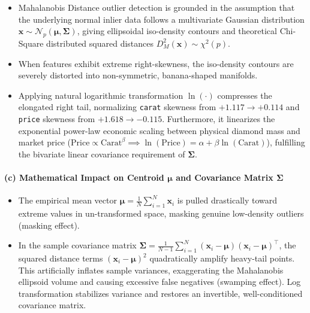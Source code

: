 \begin{tcolorbox}
\begin{itemize}
\tightlist
\item
  Mahalanobis Distance outlier detection is grounded in the assumption that the underlying normal inlier data follows a multivariate Gaussian distribution \(\mathbf{x} \sim \mathcal{N}_p(\boldsymbol{\mu}, \mathbf{\Sigma})\), giving ellipsoidal iso-density contours and theoretical Chi-Square distributed squared distances \(D_M^2(\mathbf{x}) \sim \chi^2(p)\).
\item
  When features exhibit extreme right-skewness, the iso-density contours are severely distorted into non-symmetric, banana-shaped manifolds.
\item
  Applying natural logarithmic transformation \(\ln(\cdot)\) compresses the elongated right tail, normalizing \texttt{carat} skewness from \(+1.117 \to +0.114\) and \texttt{price} skewness from \(+1.618 \to -0.115\). Furthermore, it linearizes the exponential power-law economic scaling between physical diamond mass and market price (\(\mathrm{Price} \propto \mathrm{Carat}^\beta \implies \ln(\mathrm{Price}) = \alpha + \beta \ln(\mathrm{Carat})\)), fulfilling the bivariate linear covariance requirement of \(\mathbf{\Sigma}\).
\end{itemize}

\paragraph{\texorpdfstring{\textbf{(c) Mathematical Impact on Centroid \(\boldsymbol{\mu}\) and Covariance Matrix \(\mathbf{\Sigma}\)}}{(c) Mathematical Impact on Centroid \textbackslash boldsymbol\{\textbackslash mu\} and Covariance Matrix \textbackslash mathbf\{\textbackslash Sigma\}}}

\begin{itemize}
\tightlist
\item
  The empirical mean vector \(\boldsymbol{\mu} = \frac{1}{N} \sum_{i=1}^N \mathbf{x}_i\) is pulled drastically toward extreme values in un-transformed space, masking genuine low-density outliers (masking effect).
\item
  In the sample covariance matrix \(\mathbf{\Sigma} = \frac{1}{N-1} \sum_{i=1}^N (\mathbf{x}_i - \boldsymbol{\mu})(\mathbf{x}_i - \boldsymbol{\mu})^\top\), the squared distance terms \((\mathbf{x}_i - \boldsymbol{\mu})^2\) quadratically amplify heavy-tail points. This artificially inflates sample variances, exaggerating the Mahalanobis ellipsoid volume and causing excessive false negatives (swamping effect). Log transformation stabilizes variance and restores an invertible, well-conditioned covariance matrix.
\end{itemize}
\end{tcolorbox}
